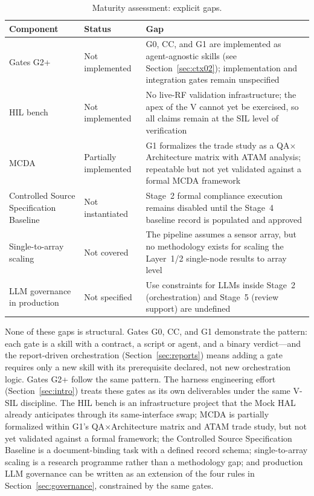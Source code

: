 \documentclass[11pt,a4paper]{article}
\begin{document}
\begin{table}[htbp]
\centering
\caption{Maturity assessment: explicit gaps.}
\label{tab:gaps}
\small
\begin{tabular}{@{}lp{3.1cm}p{7.2cm}@{}}
\toprule
\textbf{Component} & \textbf{Status} & \textbf{Gap} \\
\midrule
Gates G2+ & Not implemented & G0, CC, and G1 are implemented as agent-agnostic skills (see Section~\ref{sec:ctx02}); implementation and integration gates remain unspecified \\
HIL bench & Not implemented & No live-RF validation infrastructure; the apex of the V cannot yet be exercised, so all claims remain at the SIL level of verification \\
MCDA \cite{mcda2026} & Partially implemented & G1 formalizes the trade study as a QA$\times$Architecture matrix with ATAM analysis; repeatable but not yet validated against a formal MCDA framework \\
Controlled Source Specification Baseline & Not instantiated & Stage~2 formal compliance execution remains disabled until the Stage~4 baseline record is populated and approved \\
Single-to-array scaling & Not covered & The pipeline assumes a sensor array, but no methodology exists for scaling the Layer~1/2 single-node results to array level \\
LLM governance in production & Not specified & Use constraints for LLMs inside Stage~2 (orchestration) and Stage~5 (review support) are undefined \\
\bottomrule
\end{tabular}
\end{table}

None of these gaps is structural. Gates G0, CC, and G1 demonstrate the pattern: each gate is
a skill with a contract, a script or agent, and a binary verdict---and the report-driven
orchestration (Section~\ref{sec:reports}) means adding a gate requires only a new skill with
its prerequisite declared, not new orchestration logic. Gates G2+ follow the same pattern.
The harness engineering effort
(Section~\ref{sec:intro}) treats these gates as its own deliverables under the same V-SIL
discipline. The HIL bench is an
infrastructure project that the Mock HAL already anticipates through its same-interface swap;
MCDA is partially formalized within G1's QA$\times$Architecture matrix and ATAM trade study,
but not yet validated against a formal framework; the Controlled Source
Specification Baseline is a document-binding task with a defined record schema; single-to-array
scaling is a research programme rather than a methodology gap; and production LLM governance
can be written as an extension of the four rules in Section~\ref{sec:governance}, constrained by the
same gates.
\end{document}
